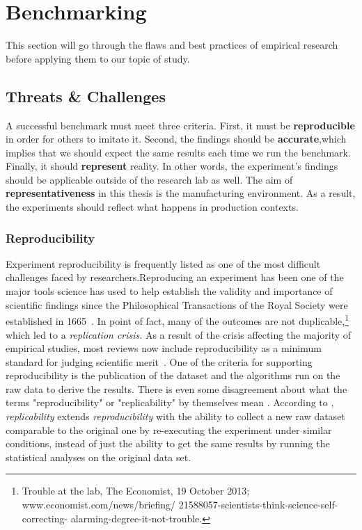 \newpage
\section{Benchmarking}\label{sec:soa_benchmarking}
This section will go through the flaws and best practices of empirical research before applying them to our topic of study.

\subsection{Threats \& Challenges}
A successful benchmark must meet three criteria.
First, it must be \textbf{reproducible} in order for others to imitate it.
Second, the findings should be \textbf{accurate},which implies that we should expect the same results each time we run the benchmark.
Finally, it should \textbf{represent} reality.
In other words, the experiment's findings should be applicable outside of the research lab as well.
The aim of \textbf{representativeness} in this thesis is the manufacturing environment.
As a result, the experiments should reflect what happens in production contexts.

\subsubsection{Reproducibility}
Experiment reproducibility is frequently listed as one of the most difficult challenges faced by researchers.Reproducing an experiment has been one of the major tools science has used to help establish the validity and importance of scientific findings since the Philosophical Transactions of the Royal Society were established in 1665~\cite{hankins1986debate}. In point of fact, many of the outcomes are not duplicable,\footnote{Trouble at the lab, The Economist, 19 October 2013;  www.economist.com/news/briefing/ 21588057-scientists-think-science-self-correcting- alarming-degree-it-not-trouble.} which led to a \emph{replication crisis}.
As a result of the crisis affecting the majority of empirical studies, most reviews now include reproducibility as a minimum standard for judging scientific merit~\cite{peng2011reproducible}.
One of the criteria for  supporting reproducibility is the publication of the dataset and the algorithms run on the raw data to derive the results.
There is even some disagreement about what the terms "reproducibility" or "replicability" by themselves mean \cite{goodman2016does}.
According to \cite{echtler2018open}, \emph{replicability} extends \emph{reproducibility} with the ability to collect a new raw dataset comparable to the original one by re-executing the experiment under similar conditions, instead of just the ability to get the same results by running the statistical analyses on the original data set.
